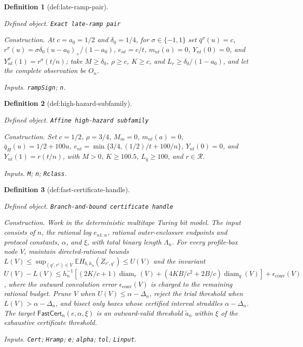 \documentclass{article}
\newtheorem{definition}{Definition}
\begin{document}
\begin{definition}[def:late-ramp-pair]\label{def:late-ramp-pair}
\par\smallskip\noindent\emph{Defined object.} \texttt{Exact late-\allowbreak{}ramp pair}
\par\smallskip\noindent\emph{Construction.} At \(c=a_0=1/2\) and \(\delta_0=1/4\), for \(\sigma\in\{-1,1\}\) set \(\bar q^{\sigma}(u)=c\), \(r^{\sigma}(u)=\sigma\delta_0(u-a_0)_+/(1-a_0)\), \(e_{nt}=c/t\), \(m_{nt}(a)=0\), \(Y_{nt}(0)=0\), and \(Y_{nt}^{\sigma}(1)=r^{\sigma}(t/n)\); take \(M\ge\delta_0\), \(\rho\ge c\), \(K\ge c\), and \(L_r\ge\delta_0/(1-a_0)\), and let the complete observation be \(O_n\).
\par\smallskip\noindent\emph{Inputs.} \texttt{rampSign}; \texttt{n}.
\end{definition}

\begin{definition}[def:high-hazard-subfamily]\label{def:high-hazard-subfamily}
\par\smallskip\noindent\emph{Defined object.} \texttt{Affine high-\allowbreak{}hazard subfamily}
\par\smallskip\noindent\emph{Construction.} Set \(c=1/2\), \(\rho=3/4\), \(M_m=0\), \(m_{nt}(a)=0\), \(\bar q_H(u)=1/2+100u\), \(e_{nt}=\min\{3/4,(1/2)/t+100/n\}\), \(Y_{nt}(0)=0\), and \(Y_{nt}(1)=r(t/n)\), with \(M>0\), \(K\ge100.5\), \(L_q\ge100\), and \(r\in\mathcal R\).
\par\smallskip\noindent\emph{Inputs.} \texttt{M}; \texttt{n}; \texttt{Rclass}.
\end{definition}

\begin{definition}[def:fast-certificate-handle]\label{def:fast-certificate-handle}
\par\smallskip\noindent\emph{Defined object.} \texttt{Branch-\allowbreak{}and-\allowbreak{}bound certificate handle}
\par\smallskip\noindent\emph{Construction.} Work in the deterministic multitape Turing bit model. The input consists of \(n\), the rational log \(e_{n1:n}\), rational outer-enclosure endpoints and protocol constants, \(\alpha\), and \(\xi\), with total binary length \(\Lambda_n\). For every profile-box node \(V\), maintain directed-rational bounds \(L(V)\le\sup_{(q',r')\in V}\mathbb E H_{b,h_n}(Z_{r',q'})\le U(V)\) and the invariant \(U(V)-L(V)\le h_n^{-1}[(2K/c+1)\operatorname{diam}_r(V)+(4KB/c^2+2B/c)\operatorname{diam}_q(V)]+\epsilon_{\mathrm{conv}}(V)\), where the outward convolution error \(\epsilon_{\mathrm{conv}}(V)\) is charged to the remaining rational budget. Prune \(V\) when \(U(V)\le\alpha-\Delta_n\), reject the trial threshold when \(L(V)>\alpha-\Delta_n\), and bisect only boxes whose certified interval straddles \(\alpha-\Delta_n\). The target \(\mathsf{FastCert}_n(e,\alpha,\xi)\) is an outward-valid threshold \(\widetilde a_n\) within \(\xi\) of the exhaustive certificate threshold.
\par\smallskip\noindent\emph{Inputs.} \texttt{Cert}; \texttt{Hramp}; \texttt{e}; \texttt{alpha}; \texttt{tol}; \texttt{Linput}.
\end{definition}
\end{document}
